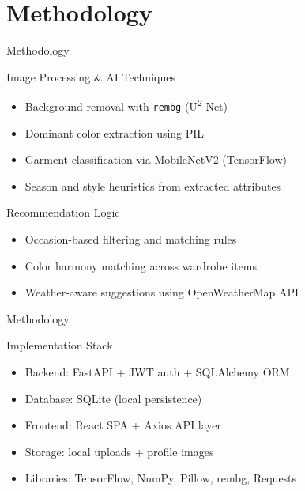 \documentclass[11pt,aspectratio=169,notes,mathserif]{beamer}
\begin{document}
\section{Methodology}

\begin{frame}{Methodology}
\footnotesize
\begin{block}{Image Processing \& AI Techniques}
\begin{itemize}
    \item Background removal with \texttt{rembg} (U\textsuperscript{2}-Net)
    \item Dominant color extraction using PIL
    \item Garment classification via MobileNetV2 (TensorFlow)
    \item Season and style heuristics from extracted attributes
\end{itemize}
\end{block}

\vspace{0.25cm}

\begin{block}{Recommendation Logic}
\begin{itemize}
    \item Occasion-based filtering and matching rules
    \item Color harmony matching across wardrobe items
    \item Weather-aware suggestions using OpenWeatherMap API
\end{itemize}
\end{block}
\end{frame}

\begin{frame}{Methodology}
\footnotesize
\begin{block}{Implementation Stack}
\begin{itemize}
    \item Backend: FastAPI + JWT auth + SQLAlchemy ORM
    \item Database: SQLite (local persistence)
    \item Frontend: React SPA + Axios API layer
    \item Storage: local uploads + profile images
    \item Libraries: TensorFlow, NumPy, Pillow, rembg, Requests
\end{itemize}
\end{block}
\end{frame}

\end{document}
